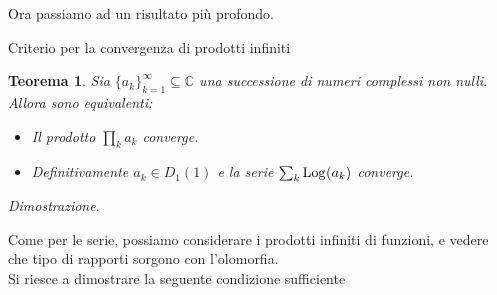 \documentclass[11pt]{book}
\makeatletter
\theoremstyle{Definizione}
\theoremstyle{TeoremaProposizioneLemmaCorollarioCongettura}
\newtheorem{myteo}{Teorema}[section]
\theoremstyle{OsservazioneNotaEsempio}
\renewenvironment{proof}[1][\proofname]{\par
  \normalfont \topsep6\p@\@plus6\p@\relax
  \trivlist
  \item[\hskip\labelsep
        \itshape
    #1\@addpunct{.}]\ignorespaces
}{%
  \endtrivlist\@endpefalse
}
\renewenvironment{proof}{\textsl{Dimostrazione}.}{}
\newcommand{\C}{\mathbb{C}}
\newcommand{\Disc}[3][]{D^{#1}_{{#2}}({#3})}
\newcommand{\Log}[1][]{\textup{Log}_{#1}}
\makeatother
\begin{document}
\noindent
Ora passiamo ad un risultato più profondo.
\begin{boxteo}{Criterio per la convergenza di prodotti infiniti}
\begin{myteo}\label{teo:CriterioConvergenzaProdottiInfiniti}
Sia $\{a_k\}_{k = 1}^\infty\subseteq \C$ una successione di numeri complessi non nulli. Allora sono equivalenti:
\begin{itemize}
\item[$(i)$] Il prodotto $\prod_k a_k$ converge.
\item[$(ii)$] Definitivamente $a_k \in \Disc{1}{1}$ e la serie $\sum_k \Log(a_k)$ converge.
\end{itemize}
\end{myteo}
\tcblower
\begin{proof}
\end{proof}
\end{boxteo}
\noindent
Come per le serie, possiamo considerare i prodotti infiniti di funzioni, e vedere che tipo di rapporti sorgono con l'olomorfia.\\
Si riesce a dimostrare la seguente condizione sufficiente
\end{document}
